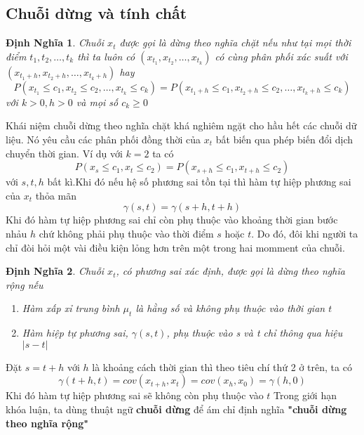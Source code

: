 \documentclass[twoside,12pt]{Latex/Classes/PhDthesisPSnPDF}
\newtheorem{defi}{Định Nghĩa}[chapter]
\begin{document}
\subsection{Chuỗi dừng và tính chất}
\begin{defi}
	Chuỗi $x_t$ được gọi là dừng theo nghĩa chặt\cite{tsa3} nếu như tại mọi thời điểm $t_1,t_2,\dots,t_k$ thì ta luôn có $(x_{t_1},x_{t_2},\dots,x_{t_k})$ có cùng phân phối xác suất với $(x_{t_1+h},x_{t_2+h},\dots,x_{t_k+h})$ hay
	\begin{equation}
		P(x_{t_1} \leq c_1,x_{t_2} \leq c_2,\dots,x_{t_k} \leq c_k) = P(x_{t_1+h} \leq c_1,x_{t_2+h} \leq c_2,\dots,x_{t_k+h} \leq c_k)
	\end{equation}
	với $k > 0 , h > 0$ và mọi số $c_k \geq 0$
\end{defi}
Khái niệm chuỗi dừng theo nghĩa chặt khá nghiêm ngặt cho hầu hết các chuỗi dữ liệu. Nó yêu cầu các phân phối đồng thời của $x_t$ bất biến qua phép biến đổi dịch chuyển thời gian. Ví dụ với $k=2$ ta có 
\begin{equation}
 P(x_s \leq c_1,x_t \leq c_2) = P(x_{s+h} \leq c_1,x_{t+h} \leq c_2)
\end{equation} với $s,t,h$ bất kì.Khi đó nếu hệ số phương sai tồn tại thì hàm tự hiệp phương sai của $x_t$ thỏa mãn 
\begin{equation}
	\gamma(s,t) = \gamma(s+h,t+h)
\end{equation}
Khi đó hàm tự hiệp phương sai chỉ còn phụ thuộc vào khoảng thời gian bước nhảu $h$ chứ không phải phụ thuộc vào thời điểm $s$ hoặc $t$. Do đó, đôi khi người ta chỉ đòi hỏi một vài điều kiện lỏng hơn trên một trong hai momment của chuỗi. 
 \begin{defi}
  Chuỗi $x_t$, có phương sai xác định, được gọi là dừng theo nghĩa rộng \cite{tsa3} nếu
  \begin{enumerate}
  \item Hàm xấp xỉ trung bình $\mu_t$ là hằng số và không phụ thuộc vào thời gian $t$
  \item Hàm hiệp tự phương sai, $\gamma(s,t)$, phụ thuộc vào s và t chỉ thông qua hiệu $|s-t|$ 
  \end{enumerate}
 \end{defi}
 Đặt $s=t+h$ với $h$ là khoảng cách thời gian thì theo tiêu chí thứ 2 ở trên, ta có
 \begin{equation}
 \gamma(t+h,t) = cov(x_{t+h},x_t) = cov(x_h,x_0) = \gamma(h,0)
 \end{equation}
 Khi đó hàm tự hiệp phương sai sẽ không còn phụ thuộc vào $t$
 Trong giới hạn khóa luận, ta dùng thuật ngữ \textbf{chuỗi dừng} để ám chỉ định nghĩa \textbf{"chuỗi dừng theo nghĩa rộng"}
\end{document}

